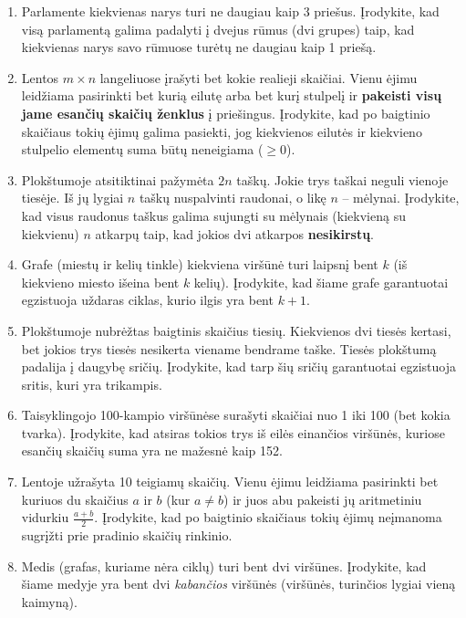 \documentclass[11pt,a4paper]{scrartcl}
\begin{document}
\begin{enumerate}
    \item Parlamente kiekvienas narys turi ne daugiau kaip 3 priešus. Įrodykite, kad visą parlamentą galima padalyti į dvejus rūmus (dvi grupes) taip, kad kiekvienas narys savo rūmuose turėtų ne daugiau kaip 1 priešą.
    \item Lentos $m \times n$ langeliuose įrašyti bet kokie realieji skaičiai. Vienu ėjimu leidžiama pasirinkti bet kurią eilutę arba bet kurį stulpelį ir \textbf{pakeisti visų jame esančių skaičių ženklus} į priešingus. Įrodykite, kad po baigtinio skaičiaus tokių ėjimų galima pasiekti, jog kiekvienos eilutės ir kiekvieno stulpelio elementų suma būtų neneigiama ($\ge 0$).
    \item Plokštumoje atsitiktinai pažymėta $2n$ taškų. Jokie trys taškai neguli vienoje tiesėje. Iš jų lygiai $n$ taškų nuspalvinti raudonai, o likę $n$ – mėlynai. Įrodykite, kad visus raudonus taškus galima sujungti su mėlynais (kiekvieną su kiekvienu) $n$ atkarpų taip, kad jokios dvi atkarpos \textbf{nesikirstų}.
    \item Grafe (miestų ir kelių tinkle) kiekviena viršūnė turi laipsnį bent $k$ (iš kiekvieno miesto išeina bent $k$ kelių). Įrodykite, kad šiame grafe garantuotai egzistuoja uždaras ciklas, kurio ilgis yra bent $k+1$.
    \item Plokštumoje nubrėžtas baigtinis skaičius tiesių. Kiekvienos dvi tiesės kertasi, bet jokios trys tiesės nesikerta viename bendrame taške. Tiesės plokštumą padalija į daugybę sričių. Įrodykite, kad tarp šių sričių garantuotai egzistuoja sritis, kuri yra trikampis.
    \item Taisyklingojo 100-kampio viršūnėse surašyti skaičiai nuo 1 iki 100 (bet kokia tvarka). Įrodykite, kad atsiras tokios trys iš eilės einančios viršūnės, kuriose esančių skaičių suma yra ne mažesnė kaip 152.
    \item Lentoje užrašyta 10 teigiamų skaičių. Vienu ėjimu leidžiama pasirinkti bet kuriuos du skaičius $a$ ir $b$ (kur $a \ne b$) ir juos abu pakeisti jų aritmetiniu vidurkiu $\frac{a+b}{2}$. Įrodykite, kad po baigtinio skaičiaus tokių ėjimų neįmanoma sugrįžti prie pradinio skaičių rinkinio.
    \item Medis (grafas, kuriame nėra ciklų) turi bent dvi viršūnes. Įrodykite, kad šiame medyje yra bent dvi \textit{kabančios} viršūnės (viršūnės, turinčios lygiai vieną kaimyną).
    

\end{enumerate}
\end{document}
